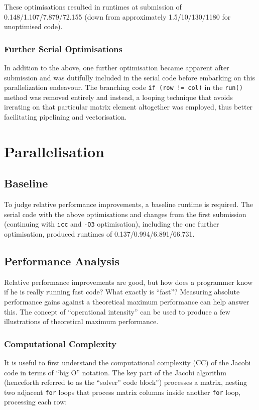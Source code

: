 \documentclass{article}
\begin{document}
These optimisations resulted in runtimes at submission of
0.148/1.107/7.879/72.155 (down from approximately 1.5/10/130/1180 for
unoptimised code).

\subsubsection{Further Serial Optimisations}
In addition to the above, one further optimisation became apparent
after submission and was dutifully included in the serial code before
embarking on this parallelization endeavour. The branching code
\texttt{if (row != col)} in the \texttt{run()} method was removed
entirely and instead, a looping technique that avoids irerating on
that particular matrix element altogether was employed, thus better
facilitating pipelining and vectorisation.

\section{Parallelisation}

\subsection{Baseline}
To judge relative performance improvements, a baseline runtime is
required. The serial code with the above optimisations and changes
from the first submission (continuing with \texttt{icc} and
\texttt{-O3} optimisation), including the one further optimisation,
produced runtimes of 0.137/0.994/6.891/66.731.

\subsection{Performance Analysis}
Relative performance improvements are good, but how does a programmer
know if he is really running fast code? What exactly is ``fast''?
Measuring absolute performance gains against a theoretical maximum
performance can help answer this. The concept of ``operational
intensity'' can be used to produce a few illustrations of
theoretical maximum performance.

\subsubsection{Computational Complexity}
It is useful to first understand the computational complexity (CC) of
the Jacobi code in terms of ``big O'' notation. The key part of the
Jacobi algorithm (henceforth referred to as the ``solver'' code
block'') processes a matrix, nesting two adjacent \texttt{for} loops
that process matrix columns inside another \texttt{for} loop,
processing each row:
\end{document}
